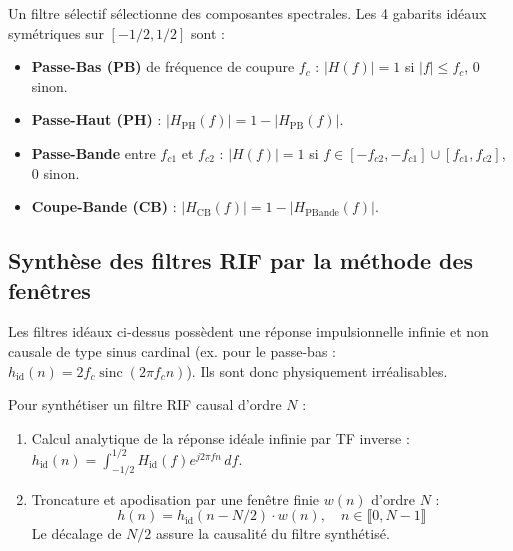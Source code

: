 Un filtre sélectif sélectionne des composantes spectrales. Les 4 gabarits idéaux symétriques sur $[-1/2, 1/2]$ sont :
\begin{itemize}
    \item \textbf{Passe-Bas (PB)} de fréquence de coupure $f_c$ : $|H(f)| = 1$ si $|f| \leqslant f_c$, $0$ sinon.
    \item \textbf{Passe-Haut (PH)} : $|H_{\text{PH}}(f)| = 1 - |H_{\text{PB}}(f)|$.
    \item \textbf{Passe-Bande} entre $f_{c1}$ et $f_{c2}$ : $|H(f)| = 1$ si $f \in [-f_{c2}, -f_{c1}] \cup [f_{c1}, f_{c2}]$, $0$ sinon.
    \item \textbf{Coupe-Bande (CB)} : $|H_{\text{CB}}(f)| = 1 - |H_{\text{PBande}}(f)|$.
\end{itemize}

\subsection{Synthèse des filtres RIF par la méthode des fenêtres}

Les filtres idéaux ci-dessus possèdent une réponse impulsionnelle infinie et non causale de type sinus cardinal (ex. pour le passe-bas : $h_{\text{id}}(n) = 2 f_c \operatorname{sinc}(2\pi f_c n)$). Ils sont donc physiquement irréalisables.

\begin{definition}
    Pour synthétiser un filtre RIF causal d'ordre $N$ :
    \begin{enumerate}
        \item Calcul analytique de la réponse idéale infinie par TF inverse : $h_{\text{id}}(n) = \int_{-1/2}^{1/2} H_{\text{id}}(f) e^{j 2\pi f n} \, df$.
        \item Troncature et apodisation par une fenêtre finie $w(n)$ d'ordre $N$ :
            \begin{equation}
                h(n) = h_{\text{id}}(n - N/2) \cdot w(n), \quad n \in \llbracket 0, N-1 \rrbracket
            \end{equation}
            Le décalage de $N/2$ assure la causalité du filtre synthétisé.
    \end{enumerate}
\end{definition}